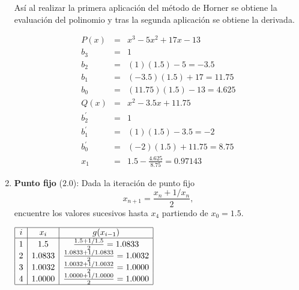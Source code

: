 \documentclass[12pt]{article}
\begin{document}
\begin{enumerate}[leftmargin=*,widest=9]
Así al realizar la primera aplicación del método de Horner se obtiene la evaluación del polinomio y tras la segunda aplicación se obtiene la derivada.

\begin{eqnarray*}
P(x) & = & x^3 - 5x^2 + 17x -13\\
b_3 & = & 1 \\
b_2 & = & (1)(1.5) - 5 = -3.5\\
b_1 & = & (-3.5)(1.5) + 17 = 11.75\\
b_0 & = & (11.75)(1.5) - 13 = 4.625 \\
Q(x) & = & x^2 - 3.5x + 11.75 \\
b^\prime_2 & = & 1 \\
b^\prime_1 & = & (1)(1.5) - 3.5 = -2\\
b^\prime_0 & = & (-2)(1.5) + 11.75 = 8.75\\
x_1 & = & 1.5 - \frac{4.625}{8.75} = 0.97143
\end{eqnarray*}
   
    \item \textbf{Punto fijo} ($2.0$): Dada la iteración de punto fijo \[ x_{n+1} = \frac{x_n + 1/x_n}{2},\] encuentre los valores sucesivos hasta \(x_4\) partiendo de \(x_0=1.5\).
    
 \centering   \( \begin{array}{|c|c|c|}
    \hline
    i & x_i & g(x_{i-1})\\
    \hline
    1 & 1.5 & \frac{1.5 + 1/1.5}{2} = 1.0833\\
    2 & 1.0833 & \frac{1.0833 + 1/1.0833}{2} = 1.0032\\
    3 & 1.0032 & \frac{1.0032 + 1/1.0032}{2} = 1.0000\\
    4 & 1.0000 & \frac{1.0000 + 1/1.0000}{2} = 1.0000\\
    \hline
    \end{array} \)
    
    

    
  \end{enumerate}
  
\end{document}
